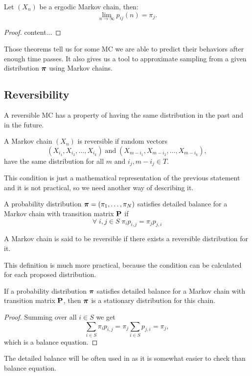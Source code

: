 	\begin{theorem}
		Let $(X_n)$ be a ergodic Markov chain, then:
		\begin{equation*}
			\lim_{n \rightarrow \infty} p_{ij}(n) = \pi_j.
		\end{equation*}
	\end{theorem}
	\begin{proof}
		content...
	\end{proof}
	
	Those theorems tell us for some MC we are able to predict their behaviors after enough time passes. It also gives us a tool to approximate sampling from a given distribution $\boldsymbol{\pi}$ using Markov chains.
	
\subsection{Reversibility}
	A reversible MC has a property of having the same distribution in the past and in the future.
	\begin{definition}[Reversibility]
		A Markov chain $(X_n)$ is reversible if random vectors
		\begin{equation*}
			(X_{i_1}, X_{i_2}, \ldots, X_{i_k}) \; \mathrm{and} \; (X_{m-i_1}, X_{m-i_2}, \ldots, X_{m-i_k}),
		\end{equation*}
		have the same distribution for all $m$ and $i_j, m-i_j \in T$.
	\end{definition}
	
	This condition is just a mathematical representation of the previous statement and it is not practical, so we need another way of describing it.
	\begin{definition}
		A probability distribution $\boldsymbol{\pi} = (\pi_1, \ldots, \pi_N)$ satisfies detailed balance for a Markov chain with transition matrix $\mathbf{P}$ if
		\begin{equation*}
			\forall \; i,j \in S \; \pi_i p_{i,j} = \pi_j p_{j,i}
		\end{equation*}
	\end{definition}
	
	\begin{definition}
		A Markov chain is said to be reversible if there exists a reversible distribution for it.
	\end{definition}

	This definition is much more practical, because the condition can be calculated for each proposed distribution.
	
	\begin{theorem}
		If a probability distribution $\boldsymbol{\pi}$ satisfies detailed balance for a Markov chain with transition matrix $\mathbf{P}$, then $\boldsymbol{\pi}$ is a stationary distribution for this chain.
	\end{theorem}
	\begin{proof}
		Summing over all $i \in S$ we get
		\begin{equation*}
			\sum_{i \in S} \pi_i p_{i,j} = \pi_j \sum_{i \in S} p_{j,i} = \pi_j,
		\end{equation*}
		which is a balance equation.
	\end{proof}

	The detailed balance will be often used in as it is somewhat easier to check than balance equation.
	
	
	